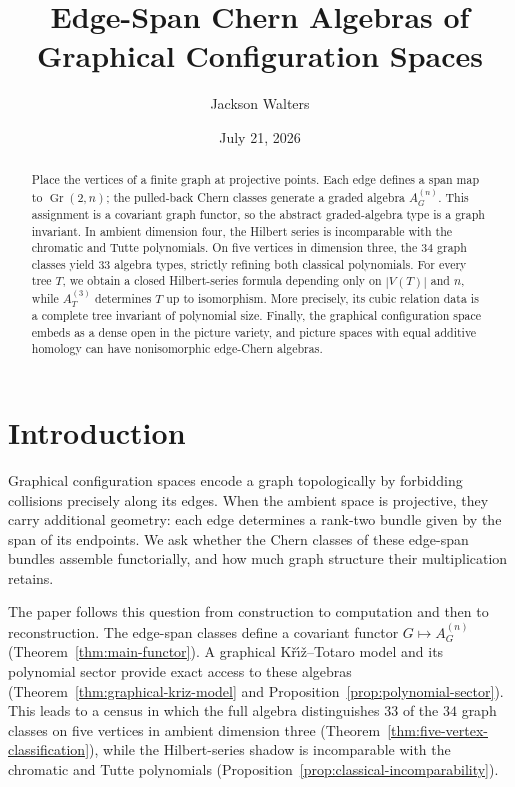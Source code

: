 \documentclass[11pt]{amsart}
\title{Edge-Span Chern Algebras of Graphical Configuration Spaces}
\author{Jackson Walters}
\date{July 21, 2026}
\theoremstyle{plain}
\theoremstyle{definition}
\theoremstyle{remark}
\newcommand{\Gr}{\operatorname{Gr}}
\begin{document}
\begin{abstract}
Place the vertices of a finite graph at projective points.  Each edge defines a
span map to $\Gr(2,n)$; the pulled-back Chern classes generate a graded algebra
$A_G^{(n)}$.  This assignment is a covariant graph functor, so the abstract
graded-algebra type is a graph invariant.  In ambient dimension four, the
Hilbert series is incomparable with the chromatic and Tutte polynomials.  On
five vertices in dimension three, the $34$ graph classes yield $33$ algebra
types, strictly refining both classical polynomials.  For every tree $T$, we
obtain a closed Hilbert-series formula depending only on $|V(T)|$ and $n$,
while $A_T^{(3)}$ determines $T$ up to isomorphism.  More precisely, its
cubic relation data is a complete tree invariant of polynomial size.  Finally,
the graphical configuration space embeds as a dense open in the picture
variety, and picture spaces with equal additive homology can have
nonisomorphic edge-Chern algebras.
\end{abstract}

\maketitle

\section{Introduction}

Graphical configuration spaces encode a graph topologically by forbidding
collisions precisely along its edges.  When the ambient space is projective,
they carry additional geometry: each edge determines a rank-two bundle given
by the span of its endpoints.  We ask whether the Chern classes of these
edge-span bundles assemble functorially, and how much graph structure their
multiplication retains.

The paper follows this question from construction to computation and then to
reconstruction.  The edge-span classes define a covariant functor
$G\mapsto A_G^{(n)}$ (Theorem~\ref{thm:main-functor}).  A graphical
K\v{r}{\'\i}\v{z}--Totaro model and its polynomial sector provide exact access to
these algebras (Theorem~\ref{thm:graphical-kriz-model} and
Proposition~\ref{prop:polynomial-sector}).  This leads to a census in which the
full algebra distinguishes $33$ of the $34$ graph classes on five vertices in
ambient dimension three (Theorem~\ref{thm:five-vertex-classification}), while
the Hilbert-series shadow is incomparable with the chromatic and Tutte
polynomials (Proposition~\ref{prop:classical-incomparability}).
\end{document}
